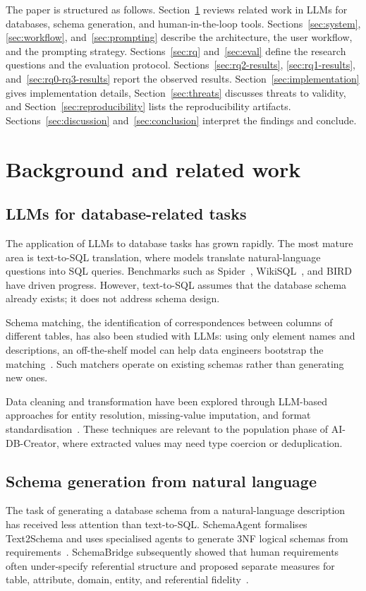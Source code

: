 \documentclass[11pt,a4paper]{article}
\newcommand{\aidb}{AI-DB-Creator}
\begin{document}
The paper is structured as follows. Section~\ref{sec:background} reviews related work in LLMs for databases, schema generation, and human-in-the-loop tools. Sections~\ref{sec:system}, \ref{sec:workflow}, and~\ref{sec:prompting} describe the architecture, the user workflow, and the prompting strategy. Sections~\ref{sec:rq} and~\ref{sec:eval} define the research questions and the evaluation protocol. Sections~\ref{sec:rq2-results}, \ref{sec:rq1-results}, and~\ref{sec:rq0-rq3-results} report the observed results. Section~\ref{sec:implementation} gives implementation details, Section~\ref{sec:threats} discusses threats to validity, and Section~\ref{sec:reproducibility} lists the reproducibility artifacts. Sections~\ref{sec:discussion} and~\ref{sec:conclusion} interpret the findings and conclude.

\section{Background and related work}
\label{sec:background}
\subsection{LLMs for database-related tasks}
The application of LLMs to database tasks has grown rapidly. The most mature area is text-to-SQL translation, where models translate natural-language questions into SQL queries. Benchmarks such as Spider~\citep{yu2018spider}, WikiSQL~\citep{zhong2017wikisql}, and BIRD~\citep{li2023bird} have driven progress. However, text-to-SQL assumes that the database schema already exists; it does not address schema design.

Schema matching, the identification of correspondences between columns of different tables, has also been studied with LLMs: using only element names and descriptions, an off-the-shelf model can help data engineers bootstrap the matching~\citep{parciak2024schema}. Such matchers operate on existing schemas rather than generating new ones.

Data cleaning and transformation have been explored through LLM-based approaches for entity resolution, missing-value imputation, and format standardisation~\citep{narayan2022data}. These techniques are relevant to the population phase of \aidb, where extracted values may need type coercion or deduplication.

\subsection{Schema generation from natural language}
The task of generating a database schema from a natural-language description has received less attention than text-to-SQL. SchemaAgent formalises Text2Schema and uses specialised agents to generate 3NF logical schemas from requirements~\citep{wang2025schemaagent}. SchemaBridge subsequently showed that human requirements often under-specify referential structure and proposed separate measures for table, attribute, domain, entity, and referential fidelity~\citep{chakrabarti2026schemabridge}.
\end{document}
